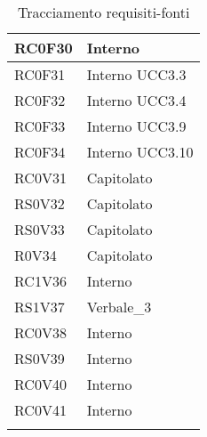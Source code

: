 \begin{center}
\begin{longtable}{|p{5cm}|p{5cm}|}
RC0F30		& Interno \\\hline
RC0F31		& Interno \newline UCC3.3 \\\hline
RC0F32		& Interno \newline UCC3.4 \\\hline
RC0F33		& Interno \newline UCC3.9 \\\hline
RC0F34		& Interno \newline UCC3.10 \\\hline
RC0V31		& Capitolato \\\hline
RS0V32		& Capitolato \\\hline
RS0V33		& Capitolato \\\hline
R0V34		& Capitolato \\\hline
RC1V36		& Interno \\\hline
RS1V37		& Verbale\_3 \\\hline
RC0V38		& Interno \\\hline
RS0V39		& Interno \\\hline
RC0V40		& Interno \\\hline
RC0V41		& Interno \\\hline
\caption{Tracciamento requisiti-fonti}
\end{longtable}
\egroup
\end{center}

